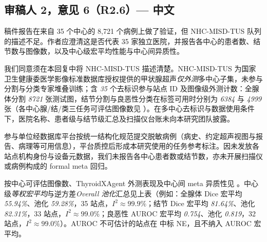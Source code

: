 \subsection*{审稿人 2，意见 6（R2.6）--- 中文}
\renewcommand{\ReviewerCommentLabel}{审稿意见：}
\renewcommand{\ResponseLabel}{回复：}
\begin{reviewercomment}
稿件报告在来自 35 个中心的 8,721 个病例上做了验证，但 NHC-MISD-TUS 队列的描述不足。作者应澄清这是否代表 35 家独立医院，并报告各中心的患者数、结节数与图像数，以及中心级宏平均性能与中心间异质性。
\end{reviewercomment}
\begin{authorresponse}
我们同意须在本回复中将 NHC-MISD-TUS 描述清楚。NHC-MISD-TUS 为国家卫生健康委医学影像标准数据库授权提供的甲状腺超声\emph{仅外测}多中心子集，未参与分割与分类专家堆叠训练；含 \emph{35} 个去标识参与站点 ID 及图像级外测计数：全腺体分割 \emph{8721} 张测试图，结节分割与良恶性分类在标签可用时分别为 \emph{6384} 与 \emph{4999} 张（各中心腺/结/类三任务可评估图像数见 ）。在多中心去标识与数据使用条件下，医院名称、患者级与结节级汇总及扫描仪台账未向本研究团队披露。\par
参与单位经数据库平台按统一结构化规范提交脱敏病例（病史、约定超声视图与报告、病理等可用信息），平台质控后形成本研究使用的任务参考标注。因未发放各站点机构身份与设备元数据，我们未报告各中心患者数或结节数，亦未开展扫描仪或病例构成的 formal meta 回归。\par
按中心可评估图像数、ThyroidXAgent 外测表现及中心间 meta 异质性见 。中心级\emph{等权宏平均}与逆方差\emph{Overall 池化}汇总见上表（例如：全腺体 Dice 宏平均 \emph{55.94\%}、池化 \emph{59.28\%}，35 站点，$I^2{\approx}99.9\%$；结节 Dice 宏平均 \emph{81.64\%}、池化 \emph{82.31\%}，33 站点，$I^2{\approx}99.0\%$；良恶性 AUROC 宏平均 \emph{0.754}、池化 \emph{0.819}，32 站点，$I^2{\approx}99.0\%$）。AUROC 不可估计的站点在  中标 NE，且不纳入 AUROC 宏平均。\par
\par
\end{authorresponse}


